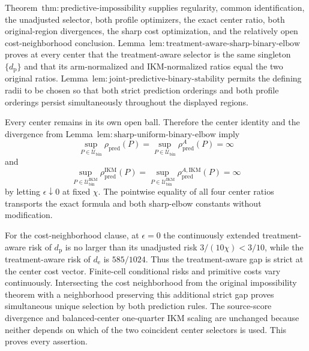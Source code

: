 Theorem~\(\mathrm{thm{:}predictive\text{-}impossibility}\) supplies regularity, common identification, the unadjusted selector, both profile optimizers, the exact center ratio, both original-region divergences, the sharp cost optimization, and the relatively open cost-neighborhood conclusion. Lemma~\(\mathrm{lem{:}treatment\text{-}aware\text{-}sharp\text{-}binary\text{-}elbow}\) proves at every center that the treatment-aware selector is the same singleton \(\{d_{\mathrm p}\}\) and that its arm-normalized and IKM-normalized ratios equal the two original ratios. Lemma~\(\mathrm{lem{:}joint\text{-}predictive\text{-}binary\text{-}stability}\) permits the defining radii to be chosen so that both strict prediction orderings and both profile orderings persist simultaneously throughout the displayed regions.

Every center remains in its own open ball. Therefore the center identity and the divergence from Lemma~\(\mathrm{lem{:}sharp\text{-}uniform\text{-}binary\text{-}elbow}\) imply
\[
 \sup_{P\in\mathcal U_{\mathrm{bin}}}\rho_{\mathrm{pred}}(P)
 =\sup_{P\in\mathcal U_{\mathrm{bin}}}\rho_{\mathrm{pred}}^A(P)=\infty
\]
and
\[
 \sup_{P\in\mathcal U_{\mathrm{bin}}^{\mathrm{IKM}}}
 \rho_{\mathrm{pred}}^{\mathrm{IKM}}(P)
 =\sup_{P\in\mathcal U_{\mathrm{bin}}^{\mathrm{IKM}}}
 \rho_{\mathrm{pred}}^{A,\mathrm{IKM}}(P)=\infty
\]
by letting \(\epsilon\downarrow0\) at fixed \(\chi\). The pointwise equality of all four center ratios transports the exact formula and both sharp-elbow constants without modification.

For the cost-neighborhood clause, at \(\epsilon=0\) the continuously extended treatment-aware risk of \(d_{\mathrm p}\) is no larger than its unadjusted risk \(3/(10\chi)<3/10\), while the treatment-aware risk of \(d_{\mathrm e}\) is \(585/1024\). Thus the treatment-aware gap is strict at the center cost vector. Finite-cell conditional risks and primitive costs vary continuously. Intersecting the cost neighborhood from the original impossibility theorem with a neighborhood preserving this additional strict gap proves simultaneous unique selection by both prediction rules. The source-score divergence and balanced-center one-quarter IKM scaling are unchanged because neither depends on which of the two coincident center selectors is used. This proves every assertion.